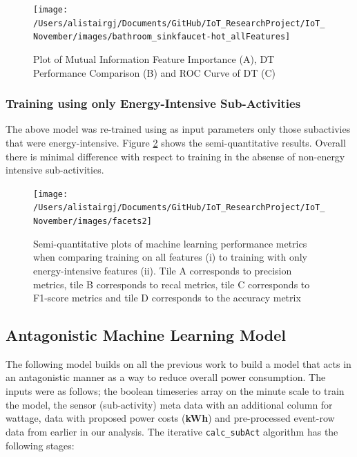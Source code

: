 \documentclass[11pt,]{article}
\begin{document}
\begin{figure}[H]

{\centering \texttt{[image: /Users/alistairgj/Documents/GitHub/IoT\_ResearchProject/IoT\_November/images/bathroom\_sinkfaucet-hot\_allFeatures]} 

}

\caption{Plot of Mutual Information Feature Importance (A), DT Performance Comparison (B) and ROC Curve of DT (C)}\label{fig:unnamed-chunk-27}
\end{figure}

\hypertarget{training-using-only-energy-intensive-sub-activities}{%
\subsubsection{Training using only Energy-Intensive
Sub-Activities}\label{training-using-only-energy-intensive-sub-activities}}

The above model was re-trained using as input parameters only those
subactivies that were energy-intensive. Figure \ref{fig:MLmetrics} shows
the semi-quantitative results. Overall there is minimal difference with
respect to training in the absense of non-energy intensive
sub-activities.

\begin{figure}[H]

{\centering \texttt{[image: /Users/alistairgj/Documents/GitHub/IoT\_ResearchProject/IoT\_November/images/facets2]} 

}

\caption{Semi-quantitative plots of machine learning performance metrics when comparing training on all features (i) to training with only energy-intensive features (ii). Tile A corresponds to precision metrics, tile B corresponds to recal metrics, tile C corresponds to F1-score metrics and tile D corresponds to the accuracy metrix}\label{fig:MLmetrics}
\end{figure}

\hypertarget{antagonistic-machine-learning-model}{%
\subsection{Antagonistic Machine Learning
Model}\label{antagonistic-machine-learning-model}}

The following model builds on all the previous work to build a model
that acts in an antagonistic manner as a way to reduce overall power
consumption. The inputs were as follows; the boolean timeseries array on
the minute scale to train the model, the sensor (sub-activity) meta data
with an additional column for wattage, data with proposed power costs
(\textbf{kWh}) and pre-processed event-row data from earlier in our
analysis. The iterative \texttt{calc\_subAct} algorithm has the
following stages:
\end{document}
